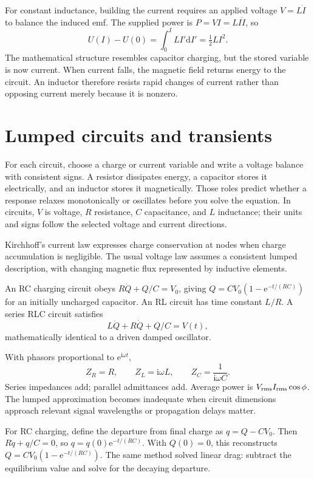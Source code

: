 \documentclass[11pt,oneside]{book}
\newcommand{\dd}{\mathrm{d}}
\newcommand{\ii}{\mathrm{i}}
\newcommand{\ee}{\mathrm{e}}
\theoremstyle{reviewstyle}
\begin{document}
For constant inductance, building the current requires an applied voltage $V=L\dot I$ to balance the induced emf. The supplied power is $P=VI=LI\dot I$, so
\begin{equation}
U(I)-U(0)=\int_0^I LI'\dd I'=\tfrac12LI^2.
\end{equation}
The mathematical structure resembles capacitor charging, but the stored variable is now current. When current falls, the magnetic field returns energy to the circuit. An inductor therefore resists rapid changes of current rather than opposing current merely because it is nonzero.

\section{Lumped circuits and transients}
For each circuit, choose a charge or current variable and write a voltage balance with consistent signs. A resistor dissipates energy, a capacitor stores it electrically, and an inductor stores it magnetically. Those roles predict whether a response relaxes monotonically or oscillates before you solve the equation. In circuits, $V$ is voltage, $R$ resistance, $C$ capacitance, and $L$ inductance; their units and signs follow the selected voltage and current directions.

Kirchhoff's current law expresses charge conservation at nodes when charge accumulation is negligible. The usual voltage law assumes a consistent lumped description, with changing magnetic flux represented by inductive elements.

An RC charging circuit obeys $R\dot Q+Q/C=V_0$, giving
$Q=CV_0(1-\ee^{-t/(RC)})$ for an initially uncharged capacitor. An RL circuit has time constant $L/R$. A series RLC circuit satisfies
\begin{equation}L\ddot Q+R\dot Q+Q/C=V(t),\end{equation}
mathematically identical to a driven damped oscillator.

With phasors proportional to $\ee^{\ii\omega t}$,
\begin{equation}Z_R=R,\qquad Z_L=\ii\omega L,\qquad Z_C=\frac1{\ii\omega C}.\end{equation}
Series impedances add; parallel admittances add. Average power is $V_{\rm rms}I_{\rm rms}\cos\phi$. The lumped approximation becomes inadequate when circuit dimensions approach relevant signal wavelengths or propagation delays matter.

For RC charging, define the departure from final charge as $q=Q-CV_0$. Then $R\dot q+q/C=0$, so $q=q(0)\ee^{-t/(RC)}$. With $Q(0)=0$, this reconstructs $Q=CV_0(1-\ee^{-t/(RC)})$. The same method solved linear drag: subtract the equilibrium value and solve for the decaying departure.
\end{document}
